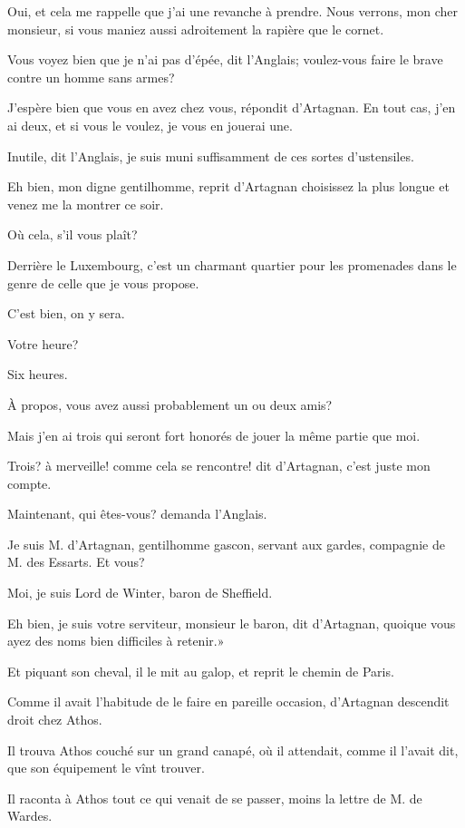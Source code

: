 \speak  Oui, et cela me rappelle que j'ai une revanche à prendre. Nous verrons, mon cher monsieur, si vous maniez aussi adroitement la rapière que le cornet. 

\speak  Vous voyez bien que je n'ai pas d'épée, dit l'Anglais; voulez-vous faire le brave contre un homme sans armes? 

\speak  J'espère bien que vous en avez chez vous, répondit d'Artagnan. En tout cas, j'en ai deux, et si vous le voulez, je vous en jouerai une. 

\speak  Inutile, dit l'Anglais, je suis muni suffisamment de ces sortes d'ustensiles. 

\speak  Eh bien, mon digne gentilhomme, reprit d'Artagnan choisissez la plus longue et venez me la montrer ce soir. 

\speak  Où cela, s'il vous plaît? 

\speak  Derrière le Luxembourg, c'est un charmant quartier pour les promenades dans le genre de celle que je vous propose. 

\speak  C'est bien, on y sera. 

\speak  Votre heure? 

\speak  Six heures. 

\speak  À propos, vous avez aussi probablement un ou deux amis? 

\speak  Mais j'en ai trois qui seront fort honorés de jouer la même partie que moi. 

\speak  Trois? à merveille! comme cela se rencontre! dit d'Artagnan, c'est juste mon compte. 

\speak  Maintenant, qui êtes-vous? demanda l'Anglais. 

\speak  Je suis M. d'Artagnan, gentilhomme gascon, servant aux gardes, compagnie de M. des Essarts. Et vous? 

\speak  Moi, je suis Lord de Winter, baron de Sheffield. 

\speak  Eh bien, je suis votre serviteur, monsieur le baron, dit d'Artagnan, quoique vous ayez des noms bien difficiles à retenir.» 

Et piquant son cheval, il le mit au galop, et reprit le chemin de Paris. 

Comme il avait l'habitude de le faire en pareille occasion, d'Artagnan descendit droit chez Athos. 

Il trouva Athos couché sur un grand canapé, où il attendait, comme il l'avait dit, que son équipement le vînt trouver. 

Il raconta à Athos tout ce qui venait de se passer, moins la lettre de M. de Wardes. 

